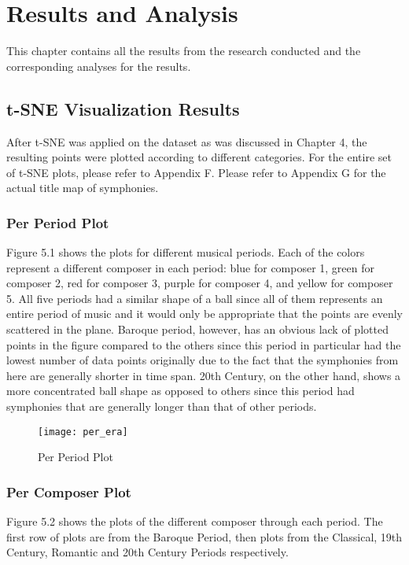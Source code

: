 %
%
%                 

\chapter{Results and Analysis}
This chapter contains all the results from the research conducted and the corresponding analyses for the results.

\section{t-SNE Visualization Results}
After t-SNE was applied on the dataset as was discussed in Chapter 4, the resulting points were plotted according to different categories. For the entire set of t-SNE plots, please refer to Appendix F. Please refer to Appendix G for the actual title map of symphonies.

\subsection{Per Period Plot}
Figure 5.1 shows the plots for different musical periods. Each of the colors represent a different composer in each period:  blue for composer 1, green for composer 2, red for composer 3, purple for composer 4, and yellow for composer 5. All five periods had a similar shape of a ball since all of them represents an entire period of music and it would only be appropriate that the points are evenly scattered in the plane. Baroque period, however, has an obvious lack of plotted points in the figure compared to the others since this period in particular had the lowest number of data points originally due to the fact that the symphonies from here are generally shorter in time span. 20th Century, on the other hand, shows a more concentrated ball shape as opposed to others since this period had symphonies that are generally longer than that of other periods.

\begin{figure}[!htb]
\caption{Per Period Plot}
\centering
\texttt{[image: per\_era]}
\end{figure}

\subsection{Per Composer Plot}
Figure 5.2 shows the plots of the different composer through each period. The first row of plots are from the Baroque Period, then plots from the Classical, 19th Century, Romantic and 20th Century Periods respectively.

